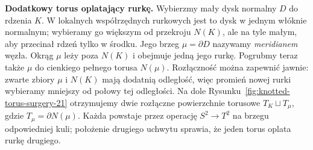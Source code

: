 \begin{przyklad}
\smallskip
\noindent\textbf{Dodatkowy torus oplatający rurkę.}
Wybierzmy mały dysk normalny $D$ do rdzenia $K$.
W lokalnych współrzędnych rurkowych jest to dysk w jednym
włóknie normalnym; wybieramy go większym od przekroju
$N(K)$, ale na tyle małym, aby przecinał rdzeń tylko w środku.
Jego brzeg $\mu=\partial D$ nazywamy \emph{meridianem} węzła.
Okrąg $\mu$ leży poza $N(K)$ i obejmuje jedną jego rurkę.
Pogrubmy teraz także $\mu$ do cienkiego pełnego torusa $N(\mu)$.
Rozłączność można zapewnić jawnie: zwarte zbiory
$\mu$ i $N(K)$ mają dodatnią odległość, więc promień nowej
rurki wybieramy mniejszy od połowy tej odległości.
Na dole Rysunku~\ref{fig:knotted-torus-surgery-21}
otrzymujemy dwie rozłączne powierzchnie torusowe
$T_K\sqcup T_\mu$, gdzie $T_\mu=\partial N(\mu)$.
Każda powstaje przez operację $S^2\to T^2$ na brzegu
odpowiedniej kuli; położenie drugiego uchwytu sprawia,
że jeden torus oplata rurkę drugiego.
\end{przyklad}

